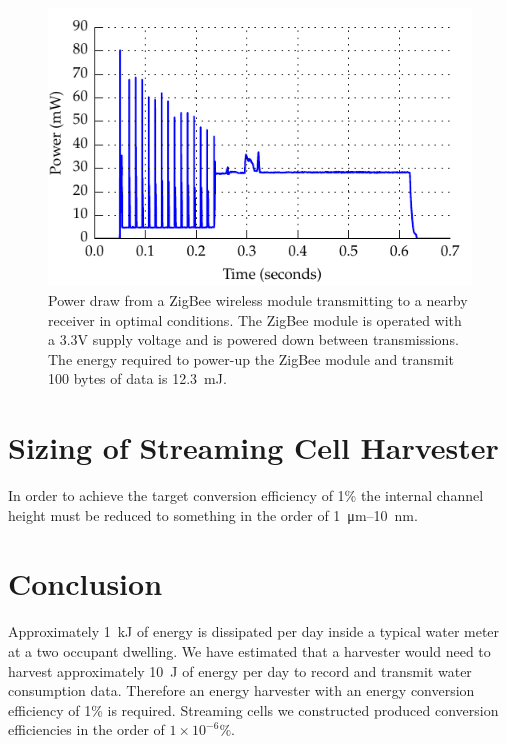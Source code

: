 \documentclass[10pt,final,journal]{IEEEtran}
\begin{document}
    \begin{figure}
        \begin{center}
        \includegraphics[width=\linewidth]{graph_XbeePower_reduced}
        \end{center}
        \caption{Power draw from a ZigBee wireless module transmitting to a nearby receiver in optimal conditions. The ZigBee module is operated with a 3.3V supply voltage and is powered down between transmissions. The energy required to power-up the ZigBee module and transmit 100 bytes of data is \SI{12.3}{\milli\joule}.}
        \label{fig:xbeePower}
    \end{figure}

    \section{Sizing of Streaming Cell Harvester}
    \label{sect:harvesterSize}
    In order to achieve the target conversion efficiency of 1\% the internal channel height must be reduced to something in the order of \SI{1}{\micro\meter}--\SI{10}{\nano\meter}.


    \section{Conclusion}
    \label{sect:conclusion}
    Approximately \SI{1}{\kilo\joule} of energy is dissipated per day inside a typical water meter at a two occupant dwelling.
    We have estimated that a harvester would need to harvest approximately \SI{10}{\joule} of energy per day to record and transmit water consumption data.
    Therefore an energy harvester with an energy conversion efficiency of 1\% is required.
    Streaming cells we constructed produced conversion efficiencies in the order of $1\times 10^{-6}\%$.

    
    
\end{document}
